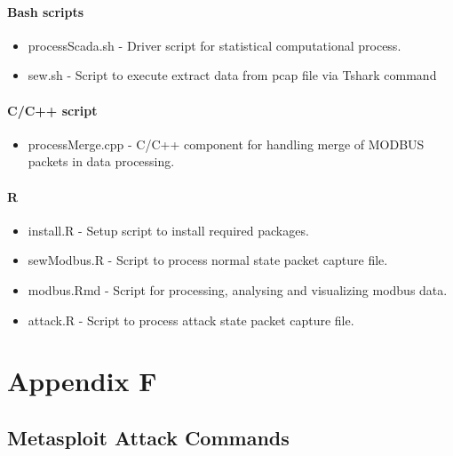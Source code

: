 \documentclass[11pt,]{article}
\begin{document}
\paragraph*{Bash scripts}\label{bash-scripts}

\begin{itemize}
\itemsep1pt\parskip0pt
\item
  processScada.sh - Driver script for statistical computational process.
\item
  sew.sh - Script to execute extract data from pcap file via Tshark
  command
\end{itemize}

\paragraph*{C/C++ script}\label{cc-script}

\begin{itemize}
\itemsep1pt\parskip0pt
\item
  processMerge.cpp - C/C++ component for handling merge of MODBUS
  packets in data processing.
\end{itemize}

\paragraph*{R}\label{r}

\begin{itemize}
\itemsep1pt\parskip0pt
\item
  install.R - Setup script to install required packages.
\item
  sewModbus.R - Script to process normal state packet capture file.
\item
  modbus.Rmd - Script for processing, analysing and visualizing modbus
  data.
\item
  attack.R - Script to process attack state packet capture file.
\end{itemize}

\newpage

\section*{Appendix F}\label{appendix-f}

\subsection*{Metasploit Attack
Commands}\label{metasploit-attack-commands}
\end{document}
